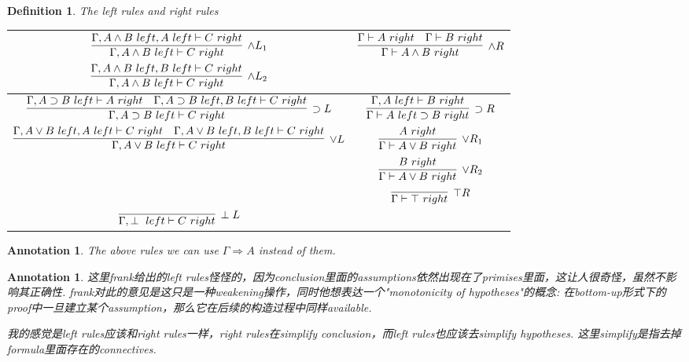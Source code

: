 \documentclass{article}
\theoremstyle{plain}
\newtheorem{definition}[theorem]{Definition}
\newtheorem{annotation}[theorem]{Annotation}
\theoremstyle{nonumberplain}
\begin{document}
\begin{definition}
\rm The left rules and right rules
\begin{center}
\begin{tabular}{|c|c|}
\hline
$\begin{aligned} \infer[\wedge L_1]{\Gamma, A \wedge B~left \vdash C~right}{\Gamma, A \wedge B~left, A~left \vdash C~right}\\ \infer[\wedge L_2]{\Gamma, A \wedge B~left \vdash C~right}{\Gamma, A \wedge B~left, B~left \vdash C~right}\end{aligned}$ &  $\infer[\wedge R]{\Gamma \vdash A \wedge B ~right}{\Gamma \vdash A~right & \Gamma \vdash B~right}$ \rule{0mm}{15mm}\\
\hline
$\infer[\supset L]{\Gamma, A \supset B~left \vdash C~right}{\Gamma, A \supset B~left \vdash A~right & \Gamma, A \supset B~left, B~left \vdash C~right}$ & $\infer[\supset R]{\Gamma \vdash A~left \supset B~right}{\Gamma, A~left \vdash B~right}$ \rule{0mm}{10mm} \\
\hline
 $\infer[\vee L]{\Gamma, A \vee B~left \vdash C~right}{\Gamma, A \vee B~left,A~left \vdash C~right & \Gamma, A \vee B~left, B~left \vdash C~right}$ & $\begin{aligned}\infer[\vee R_1]{\Gamma\vdash A \vee B~right}{A~right} \\ \infer[\vee R_2]{\Gamma\vdash A \vee B~right}{B~right} \end{aligned}$ \rule{0mm}{15mm} \\
\hline
& $\infer[\top R]{\Gamma \vdash \top~right}{}$ \rule{0mm}{10mm}  \\
\hline
$\infer[\perp L]{\Gamma,\perp~left \vdash C~right}{}$ & \rule{0mm}{10mm}\\
\hline
\end{tabular}
\end{center}
\end{definition}

\begin{annotation}
\rm The above rules we can use $\Gamma \Rightarrow A$ instead of them.
\end{annotation}

\begin{annotation}
\rm 这里frank给出的left rules怪怪的，因为conclusion里面的assumptions依然出现在了primises里面，这让人很奇怪，虽然不影响其正确性. frank对此的意见是这只是一种weakening操作，同时他想表达一个"monotonicity of hypotheses"的概念: 在bottom-up形式下的proof中一旦建立某个assumption，那么它在后续的构造过程中同样available. 

我的感觉是left rules应该和right rules一样，right rules在simplify conclusion，而left rules也应该去simplify hypotheses. 这里simplify是指去掉formula里面存在的connectives. 
\end{annotation}
\end{document}
